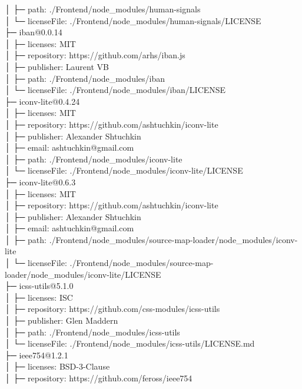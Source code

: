 │  ├─ path: ./Frontend/node\_modules/human-signals\\
│  └─ licenseFile: ./Frontend/node\_modules/human-signals/LICENSE\\
├─ iban@0.0.14\\
│  ├─ licenses: MIT\\
│  ├─ repository: https://github.com/arhs/iban.js\\
│  ├─ publisher: Laurent VB\\
│  ├─ path: ./Frontend/node\_modules/iban\\
│  └─ licenseFile: ./Frontend/node\_modules/iban/LICENSE\\
├─ iconv-lite@0.4.24\\
│  ├─ licenses: MIT\\
│  ├─ repository: https://github.com/ashtuchkin/iconv-lite\\
│  ├─ publisher: Alexander Shtuchkin\\
│  ├─ email: ashtuchkin@gmail.com\\
│  ├─ path: ./Frontend/node\_modules/iconv-lite\\
│  └─ licenseFile: ./Frontend/node\_modules/iconv-lite/LICENSE\\
├─ iconv-lite@0.6.3\\
│  ├─ licenses: MIT\\
│  ├─ repository: https://github.com/ashtuchkin/iconv-lite\\
│  ├─ publisher: Alexander Shtuchkin\\
│  ├─ email: ashtuchkin@gmail.com\\
│  ├─ path: ./Frontend/node\_modules/source-map-loader/node\_modules/iconv-lite\\
│  └─ licenseFile: ./Frontend/node\_modules/source-map-loader/node\_modules/iconv-lite/LICENSE\\
├─ icss-utils@5.1.0\\
│  ├─ licenses: ISC\\
│  ├─ repository: https://github.com/css-modules/icss-utils\\
│  ├─ publisher: Glen Maddern\\
│  ├─ path: ./Frontend/node\_modules/icss-utils\\
│  └─ licenseFile: ./Frontend/node\_modules/icss-utils/LICENSE.md\\
├─ ieee754@1.2.1\\
│  ├─ licenses: BSD-3-Clause\\
│  ├─ repository: https://github.com/feross/ieee754\\
